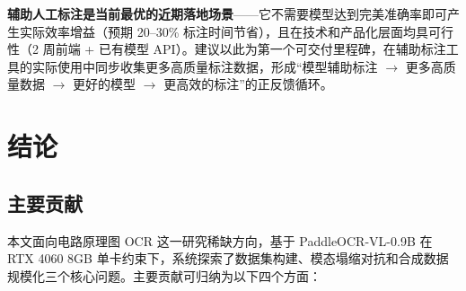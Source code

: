 \textbf{辅助人工标注是当前最优的近期落地场景}——它不需要模型达到完美准确率即可产生实际效率增益（预期 20--30\% 标注时间节省），且在技术和产品化层面均具可行性（2 周前端 + 已有模型 API）。建议以此为第一个可交付里程碑，在辅助标注工具的实际使用中同步收集更多高质量标注数据，形成``模型辅助标注 $\to$ 更多高质量数据 $\to$ 更好的模型 $\to$ 更高效的标注''的正反馈循环。

\section{结论}

\subsection{主要贡献}

本文面向电路原理图 OCR 这一研究稀缺方向，基于 PaddleOCR-VL-0.9B 在 RTX 4060 8GB 单卡约束下，系统探索了数据集构建、模态塌缩对抗和合成数据规模化三个核心问题。主要贡献可归纳为以下四个方面：

